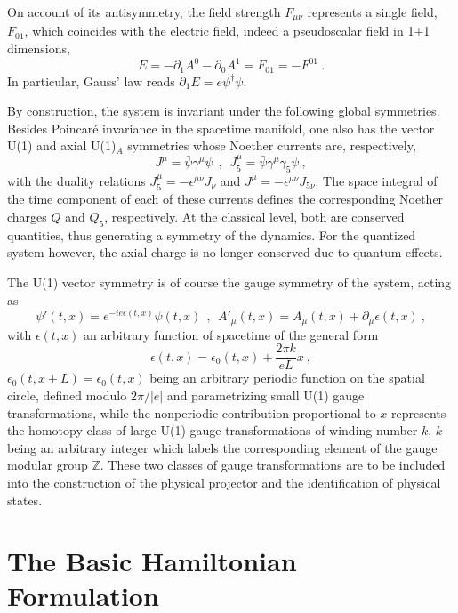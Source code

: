 \documentclass[a4paper,11pt]{article}
\def\Z{\mathbb Z}
\begin{document}
On account of its antisymmetry, the field strength $F_{\mu\nu}$ represents 
a single field, $F_{01}$, which coincides with the electric field, indeed
a pseudoscalar field in 1+1 dimensions,
\begin{equation}
E=-\partial_1A^0-\partial_0A^1=F_{01}=-F^{01}\ .
\end{equation}
In particular, Gauss' law reads $\partial_1E=e\psi^\dagger\psi$.

By construction, the system is invariant under the following
global symmetries. Besides Poincar\'e invariance in the spacetime manifold,
one also has the vector U(1) and axial U(1)$_A$ symmetries whose Noether
currents are, res\-pec\-ti\-ve\-ly,
\begin{equation}
J^\mu=\bar{\psi}\gamma^\mu\psi\ \ ,\ \ 
J^\mu_5=\bar{\psi}\gamma^\mu\gamma_5\psi\ ,
\end{equation}
with the duality relations $J^\mu_5=-\epsilon^{\mu\nu}J_\nu$ and
$J^\mu=-\epsilon^{\mu\nu}J_{5\nu}$. The space integral of the time component
of each of these currents defines the corresponding Noether charges $Q$ and
$Q_5$, respectively. At the classical level, both are conserved quantities, 
thus generating a symmetry of the dynamics. For the quantized system however, 
the axial charge is no longer conserved due to quantum effects.

The U(1) vector symmetry is of course the gauge symmetry of the system,
acting as
\begin{equation}
\psi'(t,x)=e^{-ie\epsilon(t,x)}\psi(t,x)\ \ ,\ \ 
A'_\mu(t,x)=A_\mu(t,x)+\partial_\mu\epsilon(t,x)\ ,
\end{equation}
with $\epsilon(t,x)$ an arbitrary function of spacetime of the general form
\begin{equation}
\epsilon(t,x)=\epsilon_0(t,x)+\frac{2\pi k}{eL}x\ ,
\end{equation}
$\epsilon_0(t,x+L)=\epsilon_0(t,x)$ being an arbitrary periodic function
on the spatial circle, defined modulo $2\pi/|e|$ and parametrizing small U(1)
gauge transformations, while the nonperiodic contribution proportional to $x$ 
represents the homotopy class of large U(1) gauge transformations of
winding number $k$, $k$ being an arbitrary integer which labels the 
corresponding element of the gauge modular group $\Z$. These two classes of 
gauge transformations are to be included into the construction of the 
physical projector and the identification of physical states.  

\section{The Basic Hamiltonian Formulation}
\label{Sect3}
\end{document}
